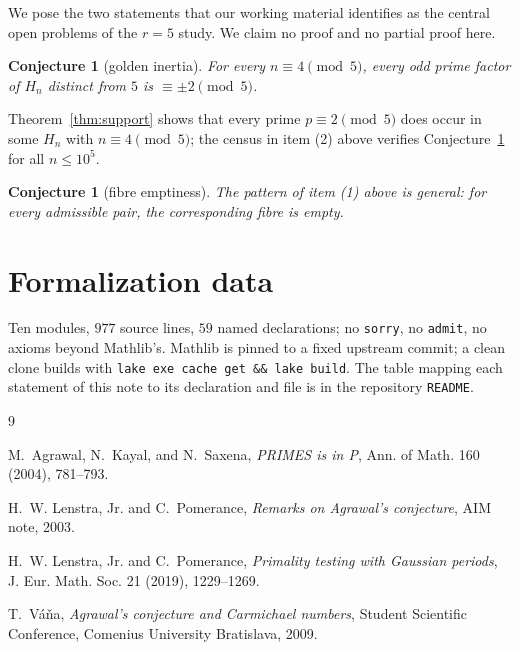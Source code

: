 \documentclass[11pt]{amsart}
\newtheorem{conjecture}[theorem]{Conjecture}
\theoremstyle{remark}
\newcommand{\lean}[1]{\texttt{#1}}
\begin{document}
We pose the two statements that our working material identifies as
the central open problems of the \(r=5\) study. We claim no proof and
no partial proof here.

\begin{conjecture}[golden inertia]\label{conj:inertia}
For every \(n\equiv4\pmod5\), every odd prime factor of \(H_n\)
distinct from \(5\) is \(\equiv\pm2\pmod5\).
\end{conjecture}

Theorem~\ref{thm:support} shows that every prime
\(p\equiv2\pmod5\) does occur in some \(H_{n}\) with
\(n\equiv4\pmod5\); the census in item (2) above verifies
Conjecture~\ref{conj:inertia} for all \(n\le10^5\).

\begin{conjecture}[fibre emptiness]\label{conj:fibres}
The pattern of item (1) above is general: for every admissible pair,
the corresponding fibre is empty.
\end{conjecture}

\section{Formalization data}

Ten modules, \(977\) source lines, \(59\) named declarations; no
\lean{sorry}, no \lean{admit}, no axioms beyond Mathlib's. Mathlib is
pinned to a fixed upstream commit; a clean clone builds with
\lean{lake exe cache get \&\& lake build}. The table mapping each
statement of this note to its declaration and file is in the
repository \lean{README}.

\begin{thebibliography}{9}

M.~Agrawal, N.~Kayal, and N.~Saxena,
\emph{PRIMES is in P},
Ann. of Math. 160 (2004), 781--793.

H.~W. Lenstra, Jr. and C.~Pomerance,
\emph{Remarks on Agrawal's conjecture},
AIM note, 2003.

H.~W. Lenstra, Jr. and C.~Pomerance,
\emph{Primality testing with Gaussian periods},
J. Eur. Math. Soc. 21 (2019), 1229--1269.

T.~V\'a\v na,
\emph{Agrawal's conjecture and Carmichael numbers},
Student Scientific Conference, Comenius University Bratislava, 2009.

\end{thebibliography}
\end{document}
